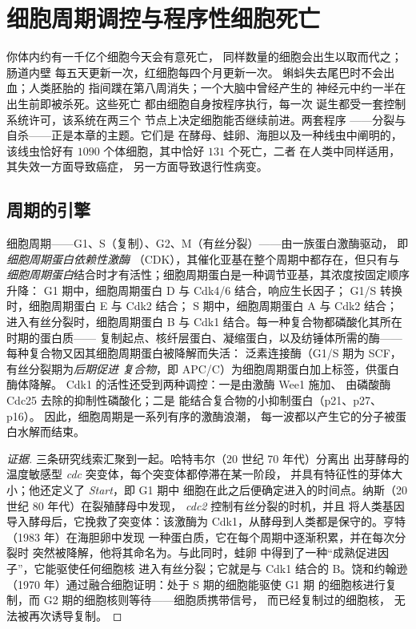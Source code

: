 \chapter{细胞周期调控与程序性细胞死亡}\label{ch:b3:cell-cycle-apoptosis}

你体内约有一千亿个细胞今天会有意死亡，
同样数量的细胞会出生以取而代之；肠道内壁
每五天更新一次，红细胞每四个月更新一次。
蝌蚪失去尾巴时不会出血；人类胚胎的
指间蹼在第八周消失；一个大脑中曾经产生的
神经元中约一半在出生前即被杀死。这些死亡
都由细胞自身按程序执行，每一次
诞生都受一套控制系统许可，该系统在两三个
节点上决定细胞能否继续前进。两套程序
——分裂与自杀——正是本章的主题。它们是
在酵母、蛙卵、海胆以及一种线虫中阐明的，
该线虫恰好有 $1090$ 个体细胞，其中恰好 $131$ 个死亡，二者
在人类中同样适用，其失效一方面导致癌症，
另一方面导致退行性病变。

\section{周期的引擎}

\begin{definition}[细胞周期蛋白与细胞周期蛋白依赖性激酶]\label{def:b3:cell-cycle-apoptosis:cdk}
细胞周期——G1、S（复制）、G2、M（有丝分裂）——由一族蛋白激酶驱动，
即\emph{细胞周期蛋白依赖性激酶}
（CDK），其催化亚基在整个周期中都存在，但只有与
\emph{细胞周期蛋白}结合时才有活性；细胞周期蛋白是一种调节亚基，其浓度按固定顺序升降：
G1 期中，细胞周期蛋白 D 与 Cdk4/6 结合，响应生长因子；
G1/S 转换时，细胞周期蛋白 E 与 Cdk2 结合；
S 期中，细胞周期蛋白 A 与 Cdk2 结合；
进入有丝分裂时，细胞周期蛋白 B 与 Cdk1 结合。每一种复合物都磷酸化其所在时期的蛋白质——
复制起点、核纤层蛋白、凝缩蛋白，以及纺锤体所需的酶——
每种复合物又因其细胞周期蛋白被降解而失活：
泛素连接酶（G1/S 期为 SCF，有丝分裂期为\emph{后期促进
复合物}，即 APC/C）为细胞周期蛋白加上标签，供蛋白酶体降解。
Cdk1 的活性还受到两种调控：一是由激酶 Wee1 施加、
由磷酸酶 Cdc25 去除的抑制性磷酸化；二是
能结合复合物的小抑制蛋白（p21、p27、p16）。
因此，细胞周期是一系列有序的激酶浪潮，
每一波都以产生它的分子被蛋白水解而结束。
\end{definition}

\begin{proof}[证据]
三条研究线索汇聚到一起。哈特韦尔（20 世纪 70 年代）分离出
出芽酵母的温度敏感型 \emph{cdc} 突变体，每个突变体都停滞在某一阶段，
并具有特征性的芽体大小；他还定义了 \emph{Start}，即 G1 期中
细胞在此之后便确定进入的时间点。纳斯（20 世纪 80 年代）在裂殖酵母中发现，
\emph{cdc2} 控制有丝分裂的时机，并且
将人类基因导入酵母后，它挽救了突变体：该激酶为
Cdk1，从酵母到人类都是保守的。亨特（1983 年）在海胆卵中发现
一种蛋白质，它在每个周期中逐渐积累，并在每次分裂时
突然被降解，他将其命名为。与此同时，蛙卵
中得到了一种“成熟促进因子”，它能驱使任何细胞核
进入有丝分裂；它就是与 Cdk1 结合的 B。饶和约翰逊
（1970 年）通过融合细胞证明：处于 S 期的细胞能驱使 G1 期
的细胞核进行复制，而 G2 期的细胞核则等待——细胞质携带信号，
而已经复制过的细胞核，
无法被再次诱导复制。
\end{proof}

